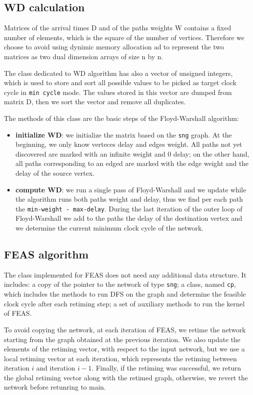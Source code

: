 \documentclass{acm_proc_article-sp}
\begin{document}
\subsection{WD calculation}

Matrices of the arrival times D and of the paths weights W contains a fixed
number of elements, which is the square of the number of vertices. Therefore
we choose to avoid using dynimic memory allocation ad to represent the two
matrices as two dual dimension arrays of size n by n.

The class dedicated to WD algorithm has also a vector of unsigned integers,
which is used to store and sort all possible values to be picked as target
clock cycle in \texttt{min cycle} mode. The values stored in this vector
are dumped from matrix D, then we sort the vector and remove all duplicates.

The methods of this class are the basic steps of the Floyd-Warshall algorithm:
\begin{itemize}
  \item {\bf initialize WD}: we initialize the matrix based on the \texttt{sng}
    graph. At the beginning, we only know verteces delay and edges weight.
    All paths not yet discovered are marked with an infinite weight and 0 delay;
    on the other hand, all paths corresponding to an edged are marked with the
    edge weight and the delay of the source vertex.
  \item {\bf compute WD}: we run a single pass of Floyd-Warshall and we
    update while the algorithm runs both paths weight and delay, thus we
    find per each path the \texttt{min-weight - max-delay}.
    During the last iteration of the outer loop of Floyd-Warshall we add to
    the paths the delay of the destination vertex and we determine the
    current minimum clock cycle of the network.
\end{itemize}

\subsection{FEAS algorithm}

The class implemented for FEAS does not need any additional data structure.
It includes: a copy of the pointer to the network of type \texttt{sng};
a class, named \texttt{cp}, which includes the methods to run DFS on the
graph and determine the feasible clock cycle after each retiming step; a
set of auxiliary methods to run the kernel of FEAS.

To avoid copying the network, at each iteration of FEAS, we retime the network
starting from the graph obtained at the previous iteration. We also update the
elements of the retiming vector, with respect to the input network, but we
use a local retiming vector at each iteration, which represents the retiming
between iteration $i$ and iteration $i-1$.
Finally, if the retiming was successful, we return the global retiming vector
along with the retimed graph, otherwise, we revert the network before retunring
to main.
\end{document}
